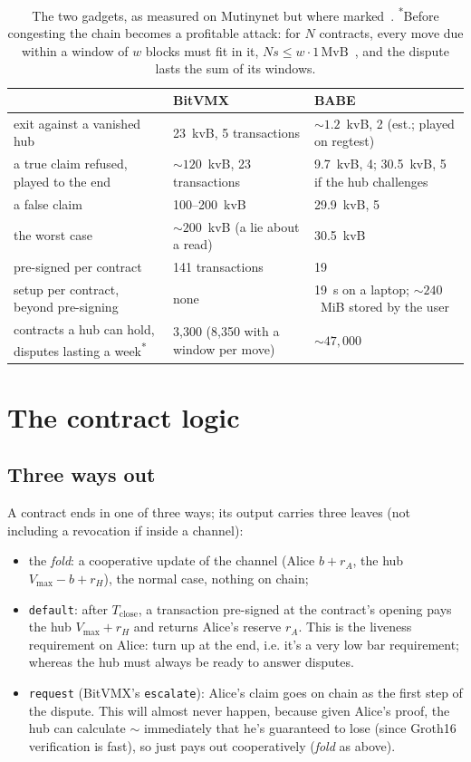 \documentclass[11pt]{article}
\newcommand{\vmax}{V_{\max}}
\newcommand{\Tc}{T_{\mathrm{close}}}
\newcommand{\tx}[1]{\texttt{#1}}
\begin{document}
\begin{table}[!htp]
\centering
\small
\begin{tabularx}{\linewidth}{>{\raggedright\arraybackslash}p{58mm}LL}
\toprule
& BitVMX & BABE \\
\midrule
exit against a vanished hub & 23~kvB, 5 transactions & ${\sim}1.2$~kvB, 2 (est.; played on regtest) \\
a true claim refused, played to the end & ${\sim}120$~kvB, 23 transactions & 9.7~kvB, 4; 30.5~kvB, 5 if the hub challenges \\
a false claim & 100--200~kvB & 29.9~kvB, 5 \\
the worst case & ${\sim}200$~kvB (a lie about a read) & 30.5~kvB \\
pre-signed per contract & 141 transactions & 19 \\
setup per contract, beyond pre-signing & none & 19~s on a laptop; ${\sim}240$~MiB stored by the user \\
contracts a hub can hold, disputes lasting a week\textsuperscript{*} & 3,300 (8,350 with a window per move) & ${\sim}47{,}000$ \\
\bottomrule
\end{tabularx}
\caption{The two gadgets, as measured on Mutinynet but where marked~\cite{lichenbitvmx,lichenbabe}.
\textsuperscript{*}Before congesting the chain becomes a profitable
attack: for $N$ contracts, every move due within a window of $w$ blocks
must fit in it, $N s \le w \cdot 1\,\mathrm{MvB}$~\cite{floodloot}, and
the dispute lasts the sum of its windows.}
\label{tab:gadgets}
\end{table}

\section{The contract logic}
\label{sec:contract}

\subsection{Three ways out}

A contract ends in one of three ways; its output carries three leaves (not including a revocation if inside a channel):
\begin{itemize}[leftmargin=1.5em]
\item the \emph{fold}: a cooperative update of the channel (Alice
  $b + r_A$, the hub $\vmax - b + r_H$), the normal case, nothing on
  chain;
\item \tx{default}: after $\Tc$, a transaction pre-signed at the
  contract's opening pays the hub $\vmax + r_H$ and returns Alice's
  reserve $r_A$. This is the liveness requirement on Alice: turn up at the end, i.e. it's a very low bar requirement; whereas the hub must always be ready to answer disputes.
\item \tx{request} (BitVMX's \tx{escalate}): Alice's claim goes on chain
  as the first step of the dispute. This will almost never happen, because given Alice's proof, the hub can calculate $\sim$ immediately that he's guaranteed to lose (since Groth16 verification is fast), so just pays out cooperatively (\emph{fold} as above).
\end{itemize}
\end{document}
